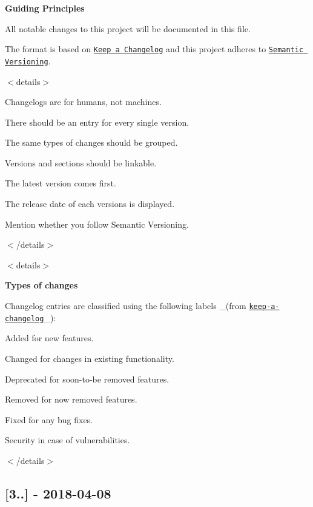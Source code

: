 {\bfseries Guiding Principles}

All notable changes to this project will be documented in this file.

The format is based on \href{http://keepachangelog.com/en/1.0.0/}{\tt Keep a Changelog} and this project adheres to \href{http://semver.org/spec/v2.0.0.html}{\tt Semantic Versioning}.

$<$details$>$


\begin{DoxyItemize}
\item Changelogs are for humans, not machines.
\item There should be an entry for every single version.
\item The same types of changes should be grouped.
\item Versions and sections should be linkable.
\item The latest version comes first.
\item The release date of each versions is displayed.
\item Mention whether you follow Semantic Versioning.
\end{DoxyItemize}

$<$/details$>$

$<$details$>$ 

{\bfseries Types of changes}

Changelog entries are classified using the following labels \+\_\+(from \href{http://keepachangelog.com/}{\tt keep-\/a-\/changelog}\+\_\+)\+:


\begin{DoxyItemize}
\item {\ttfamily Added} for new features.
\item {\ttfamily Changed} for changes in existing functionality.
\item {\ttfamily Deprecated} for soon-\/to-\/be removed features.
\item {\ttfamily Removed} for now removed features.
\item {\ttfamily Fixed} for any bug fixes.
\item {\ttfamily Security} in case of vulnerabilities.
\end{DoxyItemize}

$<$/details$>$

\subsection*{\mbox{[}3..\mbox{]} -\/ 2018-\/04-\/08}

